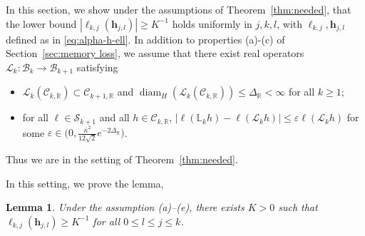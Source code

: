 \documentclass{amsart}
\numberwithin{equation}{section}
\newtheorem{lem}[thm]{Lemma}
\newcommand\cB{{\mathcal B}}
\newcommand\cC{{\mathcal C}}
\newcommand\cL{{\mathcal L}}
\newcommand\cS{{\mathcal S}}
\newcommand\bL{{\mathbb L}}
\newcommand\bR{{\mathbb R}}
\newcommand\ve{\varepsilon}
\newcommand{\diam}{\operatorname{diam}}
\begin{document}
In this section, we show under the assumptions of Theorem~\ref{thm:needed}, that the lower
bound $|\boldsymbol{\ell}_{k,j}(\boldsymbol{h}_{j,l}) | \ge K^{-1}$ holds uniformly in $j,k,l$, with 
$\boldsymbol{\ell}_{k,j}, \boldsymbol{h}_{j,l}$ defined as in \eqref{eq:alpha-h-ell}.  In addition to properties
(a)-(c) of Section~\ref{sec:memory loss}, we assume that there exist real operators $\cL_k : \cB_k \to \cB_{k+1}$
satisfying
\begin{itemize}
  \item[d)] $\cL_k(\cC_{k, \bR}) \subset \cC_{k+1, \bR}$ and $\diam_H(\cL_k(\cC_{k,\bR})) \le \Delta_{\bR} < \infty$ for all $k \ge 1$;
  \item[e)] for all $\ell \in \cS_{k+1}$ and all $h \in \cC_{k, \bR}$,
  $| \ell(\bL_k h) - \ell(\cL_k h)| \le \ve \ell(\cL_k h)$ for some $\ve \in \big(0, \frac{\bar\kappa^2}{12 \sqrt{2}} e^{-2\Delta_\bR}\big)$.
\end{itemize}
Thus we are in the setting of Theorem~\ref{thm:needed}.

In this setting, we prove the lemma,
\begin{lem}
\label{lem:lower bound}
 Under the assumption (a)--(e), there exists $K >0$ such that $\boldsymbol{\ell}_{k,j}(\boldsymbol{h}_{j,l}) \ge K^{-1}$ for all $0 \le l \le j \le k$.  
 \end{lem}
 
\end{document}
